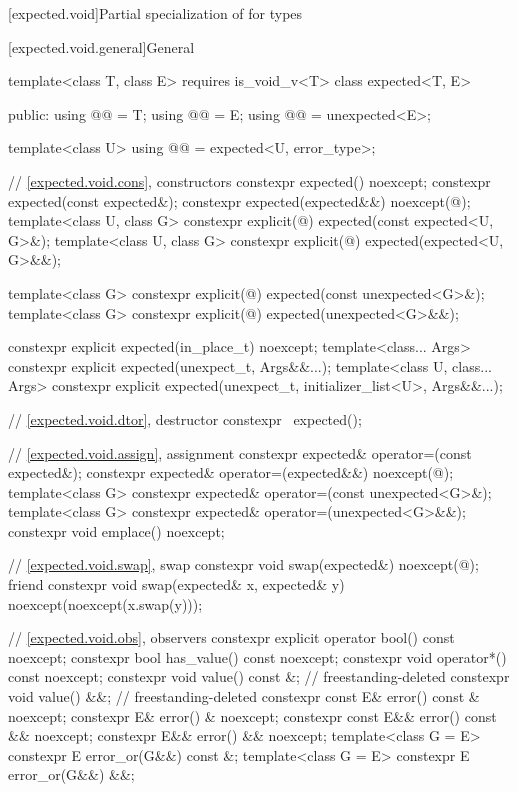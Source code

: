 [expected.void]{Partial specialization of  for  types}

[expected.void.general]{General}

\begin{codeblock}
template<class T, class E> requires is_void_v<T>
class expected<T, E> {
public:
  using @@ = T;
  using @@ = E;
  using @@ = unexpected<E>;

  template<class U>
  using @@ = expected<U, error_type>;

  // \ref{expected.void.cons}, constructors
  constexpr expected() noexcept;
  constexpr expected(const expected&);
  constexpr expected(expected&&) noexcept(@\seebelow@);
  template<class U, class G>
    constexpr explicit(@\seebelow@) expected(const expected<U, G>&);
  template<class U, class G>
    constexpr explicit(@\seebelow@) expected(expected<U, G>&&);

  template<class G>
    constexpr explicit(@\seebelow@) expected(const unexpected<G>&);
  template<class G>
    constexpr explicit(@\seebelow@) expected(unexpected<G>&&);

  constexpr explicit expected(in_place_t) noexcept;
  template<class... Args>
    constexpr explicit expected(unexpect_t, Args&&...);
  template<class U, class... Args>
    constexpr explicit expected(unexpect_t, initializer_list<U>, Args&&...);

  // \ref{expected.void.dtor}, destructor
  constexpr ~expected();

  // \ref{expected.void.assign}, assignment
  constexpr expected& operator=(const expected&);
  constexpr expected& operator=(expected&&) noexcept(@\seebelow@);
  template<class G>
    constexpr expected& operator=(const unexpected<G>&);
  template<class G>
    constexpr expected& operator=(unexpected<G>&&);
  constexpr void emplace() noexcept;

  // \ref{expected.void.swap}, swap
  constexpr void swap(expected&) noexcept(@\seebelow@);
  friend constexpr void swap(expected& x, expected& y) noexcept(noexcept(x.swap(y)));

  // \ref{expected.void.obs}, observers
  constexpr explicit operator bool() const noexcept;
  constexpr bool has_value() const noexcept;
  constexpr void operator*() const noexcept;
  constexpr void value() const &;                                           // freestanding-deleted
  constexpr void value() &&;                                                // freestanding-deleted
  constexpr const E& error() const & noexcept;
  constexpr E& error() & noexcept;
  constexpr const E&& error() const && noexcept;
  constexpr E&& error() && noexcept;
  template<class G = E> constexpr E error_or(G&&) const &;
  template<class G = E> constexpr E error_or(G&&) &&;

}
\end{codeblock}
